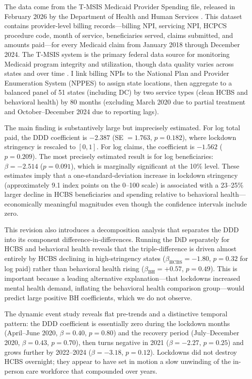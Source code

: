 \documentclass[12pt]{article}
\begin{document}
The data come from the T-MSIS Medicaid Provider Spending file, released in February 2026 by the Department of Health and Human Services \citep{hhs2026tmsis}. This dataset contains provider-level billing records---billing NPI, servicing NPI, HCPCS procedure code, month of service, beneficiaries served, claims submitted, and amounts paid---for every Medicaid claim from January 2018 through December 2024. The T-MSIS system is the primary federal data source for monitoring Medicaid program integrity and utilization, though data quality varies across states and over time \citep{macpac2021tmsis}. I link billing NPIs to the National Plan and Provider Enumeration System (NPPES) to assign state locations, then aggregate to a balanced panel of 51 states (including DC) by two service types (clean HCBS and behavioral health) by 80 months (excluding March 2020 due to partial treatment and October--December 2024 due to reporting lags).

The main finding is substantively large but imprecisely estimated. For log total paid, the DDD coefficient is $-2.387$ (SE $= 1.763$, $p = 0.182$), where lockdown stringency is rescaled to $[0,1]$. For log claims, the coefficient is $-1.562$ ($p = 0.209$). The most precisely estimated result is for log beneficiaries: $\beta = -2.514$ ($p = 0.091$), which is marginally significant at the 10\% level. These estimates imply that a one-standard-deviation increase in lockdown stringency (approximately 9.1 index points on the 0--100 scale) is associated with a 23--25\% larger decline in HCBS beneficiaries and spending relative to behavioral health---economically meaningful magnitudes even though the confidence intervals include zero.

This revision also introduces a decomposition analysis that separates the DDD into its component difference-in-differences. Running the DiD separately for HCBS and behavioral health reveals that the triple-difference is driven almost entirely by HCBS declining in high-stringency states ($\beta_{\text{HCBS}} = -1.80$, $p = 0.32$ for log paid) rather than behavioral health rising ($\beta_{\text{BH}} = +0.57$, $p = 0.49$). This is important because a leading alternative explanation---that lockdowns increased mental health demand, inflating the behavioral health comparison group---would predict large positive BH coefficients, which we do not observe.

The dynamic event study reveals flat pre-trends and a distinctive temporal pattern: the DDD coefficient is essentially zero during the lockdown months (April--June 2020, $\beta = 0.40$, $p = 0.80$) and the recovery period (July--December 2020, $\beta = 0.43$, $p = 0.70$), then turns negative in 2021 ($\beta = -2.27$, $p = 0.25$) and grows further by 2022--2024 ($\beta = -3.18$, $p = 0.12$). Lockdowns did not destroy HCBS overnight; they appear to have set in motion a slow unwinding of the in-person care workforce that compounded over years.
\end{document}
